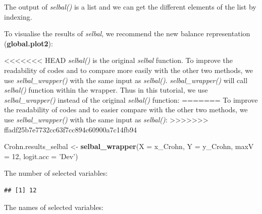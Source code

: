 \documentclass[openany]{book}
\newenvironment{Shaded}{\begin{snugshade}}{\end{snugshade}}
\newcommand{\KeywordTok}[1]{\textcolor[rgb]{0.13,0.29,0.53}{\textbf{#1}}}
\newcommand{\DataTypeTok}[1]{\textcolor[rgb]{0.13,0.29,0.53}{#1}}
\newcommand{\DecValTok}[1]{\textcolor[rgb]{0.00,0.00,0.81}{#1}}
\newcommand{\StringTok}[1]{\textcolor[rgb]{0.31,0.60,0.02}{#1}}
\newcommand{\CommentTok}[1]{\textcolor[rgb]{0.56,0.35,0.01}{\textit{#1}}}
\newcommand{\OperatorTok}[1]{\textcolor[rgb]{0.81,0.36,0.00}{\textbf{#1}}}
\newcommand{\NormalTok}[1]{#1}
\begin{document}
The output of \emph{selbal()} is a list and we can get the different
elements of the list by indexing.

To visualise the results of \emph{selbal}, we recommend the new balance
representation (\textbf{global.plot2}):

\begin{Shaded}
\end{Shaded}

<<<<<<< HEAD
\emph{selbal()} is the original \emph{selbal} function. To improve the
readability of codes and to compare more easily with the other two
methods, we use \emph{selbal\_wrapper()} with the same input as
\emph{selbal()}. \emph{selbal\_wrapper()} will call \emph{selbal()}
function within the wrapper. Thus in this tutorial, we use
\emph{selbal\_wrapper()} instead of the original \emph{selbal()}
function:
=======
To improve the readability of codes and to easier compare with the other
two methods, we use \emph{selbal\_wrapper()} with the same input as
\emph{selbal()}:
>>>>>>> ffadf25b7e7732cc63f7cc894c60900a7c14fb94

\begin{Shaded}
\begin{Highlighting}[]
\NormalTok{Crohn.results_selbal <-}\StringTok{ }\KeywordTok{selbal_wrapper}\NormalTok{(}\DataTypeTok{X =}\NormalTok{ x_Crohn, }\DataTypeTok{Y =}\NormalTok{ y_Crohn, }
                                       \DataTypeTok{maxV =} \DecValTok{12}\NormalTok{, }\DataTypeTok{logit.acc =} \StringTok{'Dev'}\NormalTok{) }
\end{Highlighting}
\end{Shaded}

The number of selected variables:

\begin{Shaded}
\end{Shaded}

\begin{verbatim}
## [1] 12
\end{verbatim}

The names of selected variables:
\end{document}
